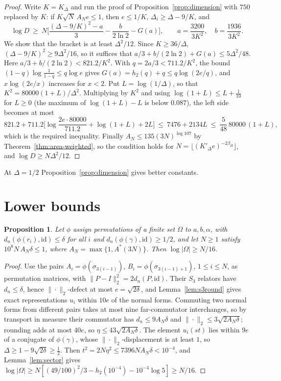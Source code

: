 \documentclass[11pt,a4paper]{article}
\theoremstyle{plain}
\newtheorem{proposition}[theorem]{Proposition}
\theoremstyle{definition}
\theoremstyle{remark}
\begin{document}
\begin{proof}
Write $K=K_\Delta$ and run the proof of Proposition~\ref{prop:dimension} with $750$ replaced by $K$: if $K\sqrt N\,A_Ne\le1$, then $e\le1/K$,
$\Delta_i\ge\Delta-9/K$, and
\[
\log D\ \ge\ N\Big[\frac{(\Delta-9/K)^2-a}{3}-\frac{b}{2\ln2}-G(a)\Big],\qquad a=\frac{3200}{3K^2},\quad b=\frac{1936}{3K^2}.
\]
We show that the bracket is at least $\Delta^2/12$. Since $K\ge36/\Delta$, $(\Delta-9/K)^2\ge9\Delta^2/16$, so it suffices that
$a/3+b/(2\ln2)+G(a)\le5\Delta^2/48$. Here $a/3+b/(2\ln2)<821.2/K^2$. With $q=2a/3<711.2/K^2$, the bound $(1-q)\log\frac1{1-q}\le q\log e$
gives $G(a)=h_2(q)+q\le q\log(2e/q)$, and $x\log(2e/x)$ increases for $x<2$. Put $L=\log(1/\Delta)$, so that $K^2=80000(1+L)/\Delta^2$.
Multiplying by $K^2$ and using $\log(1+L)\le L+\frac1{10}$ for $L\ge0$ (the maximum of $\log(1+L)-L$ is below $0.087$), the left side
becomes at most
\[
821.2+711.2\Big[\log\frac{2e\cdot80000}{711.2}+\log(1+L)+2L\Big]\ \le\ 7476+2134L\ \le\ \frac5{48}\,80000\,(1+L),
\]
which is the required inequality. Finally $A_N\le135(3N)^{\log107}$ by Theorem~\ref{thm:area-weighted}, so the condition holds for
$N=\lfloor(K'_\Delta e)^{-2\beta_H}\rfloor$, and $\log D\ge N\Delta^2/12$.
\end{proof}

At $\Delta=1/2$ Proposition~\ref{prop:dimension} gives better constants.

\section{Lower bounds}\label{sec:sofic}

\begin{proposition}\label{prop:dimension-perm}
Let $\phi$ assign permutations of a finite set $\Omega$ to $a,b,\alpha$, with $d_n(\phi(r_i),\mathrm{id})\le\delta$ for all $i$ and
$d_n(\phi(\gamma),\mathrm{id})\ge1/2$, and let $N\ge1$ satisfy $10^8N\,A_N\delta\le1$, where $A_N=\max\{1,A^*(3N)\}$. Then
$\log|\Omega|\ge N/16$.
\end{proposition}

\begin{proof}
Use the pairs $A_i=\phi(\sigma_{3(i-1)})$, $B_i=\phi(\sigma_{3(i-1)+1})$, $1\le i\le N$, as permutation matrices, with $\|P-I\|_2^2=2d_n(P,\mathrm{id})$. Their
$S_3$ relators have $d_n\le\delta$, hence $\|\cdot\|_2$-defect at most $e=\sqrt{2\delta}$, and Lemma~\ref{lem:s3round} gives exact
representations $u_i$ within $10e$ of the normal forms. Commuting two normal forms from different pairs takes at most nine
far-commutator interchanges, so by transport in measure their commutator has $d_n\le9A_N\delta$ and $\|\cdot\|_2\le3\sqrt{2A_N\delta}$;
rounding adds at most $40e$, so $\eta\le43\sqrt{2A_N\delta}$. The element $u_i(st)$ lies within $9e$ of a conjugate of $\phi(\gamma)$,
whose $\|\cdot\|_2$-displacement is at least $1$, so $\Delta\ge1-9\sqrt{2\delta}\ge\frac12$. Then $t^2=2N\eta^2\le7396NA_N\delta<10^{-4}$, and
Lemma~\ref{lem:sector} gives $\log|\Omega|\ge N[(49/100)^2/3-h_2(10^{-4})-10^{-4}\log5]\ge N/16$.
\end{proof}
\end{document}
